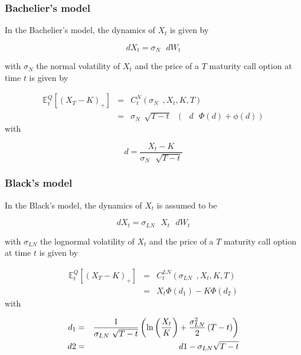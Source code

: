 \documentclass[3pt]{article}
\begin{document}
\subsubsection{Bachelier's model}

In the Bachelier's model, the dynamics of $X_{t}$ is given by

\begin{equation*}
dX_{t}=\sigma _{N}\text{ }dW_{t}
\end{equation*}

with $\sigma _{N}$ the normal volatility of $X_{t}$ and the price of a $T$
maturity call option at time $t$ is given by

\begin{eqnarray*}
\mathbb{E}_{t}^{Q}\left[ \left( X_{T}-K\right) _{+}\right]
&=&C_{t}^{N}(\sigma _{N\text{ }},X_{t},K,T) \\
&=&\sigma _{N\text{ }}\sqrt{T-t}\text{ }\left( \text{ }d\text{ }\Phi \left(
d\right) +\phi (d)\right)
\end{eqnarray*}%
with

\begin{equation*}
d=\frac{X_{t}-K}{\sigma _{N}\text{ }\sqrt{T-t}}
\end{equation*}

\subsubsection{Black's model}

In the Black's model, the dynamics of $X_{t}$ is assumed to be

\begin{equation*}
dX_{t}=\sigma _{LN}\text{ }X_{t}\text{ }dW_{t}
\end{equation*}

with $\sigma _{LN}$ the lognormal volatility of $X_{t}$ and the price of a $%
T $ maturity call option at time $t$ is given by

\begin{eqnarray*}
\mathbb{E}_{t}^{Q}\left[ \left( X_{T}-K\right) _{+}\right]
&=&C_{t}^{LN}(\sigma _{LN\text{ }},X_{t},K,T) \\
&=&X_{t}\Phi (d_{1})-K\Phi (d_{2})
\end{eqnarray*}%
with

\begin{eqnarray*}
d_{1} &=&\frac{1}{\sigma _{LN}\text{ }\sqrt{T-t}}\left( \ln \left( \frac{%
X_{t}}{K}\right) +\frac{\sigma _{LN}^{2}}{2}\left( T-t\right) \right) \\
d2 &=&d1-\sigma _{LN}\sqrt{T-t}
\end{eqnarray*}
\end{document}
